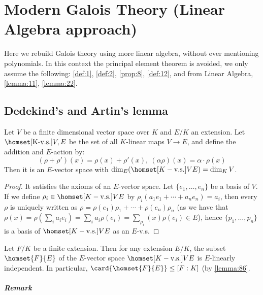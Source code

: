 
\chapter{Modern Galois Theory (Linear Algebra approach)}
\label{chap:3}

Here we rebuild Galois theory using more linear algebra, without ever mentioning polynomials. In this context the principal element theorem is avoided, we only assume the following: \autoref{def:1}, \autoref{def:2}, \autoref{prop:8}, \autoref{def:12}, and from Linear Algebra, \autoref{lemma:11}, \autoref{lemma:22}.

\section{Dedekind's and Artin's lemma}
\label{sec:3.1}

\begin{lemma}
  \label{lemma:86}
  Let $V$ be a finite dimensional vector space over $K$ and $E/K$ an extension. Let $\homset[\text{K-v.s.}]{V, E}$ be the set of all $K$-linear maps $V \rightarrow E$, and define the addition and $E$-action by:
\[
(\rho + \rho')(x) = \rho(x) + \rho'(x), \ (\alpha\rho)(x)=\alpha\cdot{}\rho(x)
\]
Then it is an $E$-vector space with $\dim_E (\homset[K-\text{v.s.}]{V}{E}) = \dim_K V$.
\end{lemma}

\begin{proof}
  It satisfies the axioms of an $E$-vector space. Let $\{ e_1, \ldots, e_n \}$ be a basis of $V$. If we define $\rho_i \in \homset[K-\text{v.s.}]{V}{E}$ by $\rho_i(a_1e_1 + \cdots{} + a_ne_n) = a_i$, then every $\rho$ is uniquely written as $\rho = \rho(e_1)\rho_1 + \cdots{} + \rho(e_n)\rho_n$ (as we have that $\rho(x) = \rho(\sum_i a_ie_i) = \sum_i a_i\rho(e_i) = \sum_\rho_i(x)\rho(e_i) \in E$), hence $\{ p_1, \ldots, p_n \}$ is a basis of $\homset[K-\text{v.s.}]{V}{E}$ as an $E$-v.s.
\end{proof}

\begin{proposition}
  \label{prop:87}
  Let $F/K$ be a finite extension. Then for any extension $E/K$, the subset $\homset{F}{E}$ of the $E$-vector space $\homset[K-\text{v.s.}]{V}{E}$ is $E$-linearly independent. In particular, $\card{\homset{F}{E}} \leq [F : K]$ (by \autoref{lemma:86}.
\end{proposition}

\paragraph{Remark}

